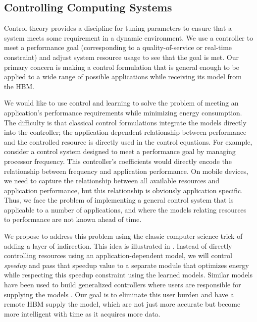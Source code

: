 
\subsection{Controlling Computing Systems}

Control theory provides a discipline for tuning parameters to ensure
that a system meets some requirement in a dynamic environment.  We use
a controller to meet a performance goal (corresponding to a
quality-of-service or real-time constraint) and adjust system resource
usage to see that the goal is met.  Our primary concern is making a
control formulation that is general enough to be applied to a wide
range of possible applications while receiving its model from the HBM.

We would like to use control and learning to solve the problem of
meeting an application's performance requirements while minimizing
energy consumption.  The difficulty is that classical control
formulations integrate the models directly into the controller; \ie{}
the application-dependent relationship between performance and the
controlled resource is directly used in the control equations.  For
example, consider a control system designed to meet a performance goal
by managing processor frequency.  This controller's coefficients would
directly encode the relationship between frequency and application
performance.  On mobile devices, we need to capture the relationship
between all available resources and application performance, but this
relationship is obviously application specific.  Thus, we face the
problem of implementing a general control system that is applicable to
a number of applications, and where the models relating resources to
performance are not known ahead of time.

We propose to address this problem using the classic computer science
trick of adding a layer of indirection.  This idea is illustrated in
.  Instead of directly controlling resources using an
application-dependent model, we will control \emph{speedup} and pass
that speedup value to a separate module that optimizes energy while
respecting this speedup constraint using the learned models.  Similar
models have been used to build generalized controllers where users are
responsible for supplying the models \cite{POET}.  Our goal is to
eliminate this user burden and have a remote HBM supply the model, which are not just more accurate but become more intelligent with time as it acquires more data.

